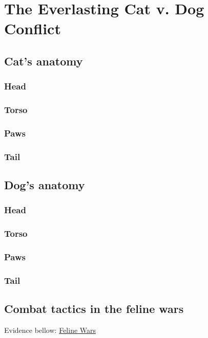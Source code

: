 \documentclass{article}
\begin{document}
    \section{The Everlasting Cat v. Dog Conflict}

        \subsection{Cat's anatomy}

            \subsubsection*{Head}
            \subsubsection*{Torso}
            \subsubsection*{Paws}
            \subsubsection*{Tail}

        \subsection{Dog's anatomy}

            \subsubsection*{Head}
            \subsubsection*{Torso}
            \subsubsection*{Paws}
            \subsubsection*{Tail}

        \subsection{Combat tactics in the feline wars}
        Evidence bellow:
        \href{https://www.youtube.com/watch?v=O7zvj9GHg8M}{Feline Wars}
\end{document}

